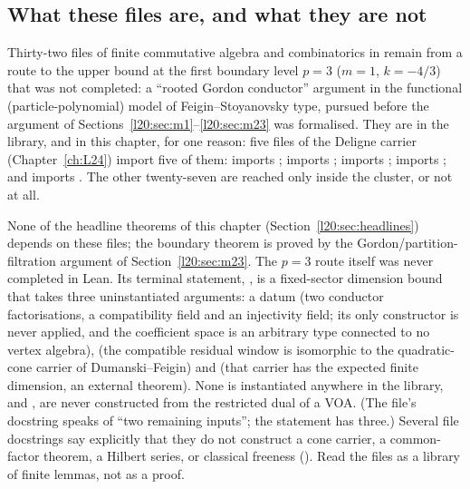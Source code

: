 \subsection{What these files are, and what they are not}

Thirty-two files of finite commutative algebra and combinatorics in  remain from a route to the upper
bound at the first boundary level $p=3$ ($m=1$, $k=-4/3$) that was not completed: a ``rooted Gordon conductor'' argument in the
functional (particle-polynomial) model of Feigin--Stoyanovsky type, pursued before the argument of
Sections~\ref{l20:sec:m1}--\ref{l20:sec:m23} was formalised. They are in the library, and in this chapter, for one reason: five files of the Deligne
carrier (Chapter~\ref{ch:L24}) import five of them:  imports
;  imports ;
 imports ;  imports
; and  imports . The
other twenty-seven are reached only inside the cluster, or not at all.

\begin{warning}[title={The $p=3$ route is incomplete and superseded; nothing in this chapter's headlines uses it}]
None of the headline theorems of this chapter (Section~\ref{l20:sec:headlines}) depends on these files; the boundary theorem is proved
by the Gordon/partition-filtration argument of Section~\ref{l20:sec:m23}. The $p=3$ route itself was never completed in Lean. Its terminal
statement, , is a fixed-sector dimension bound that takes three
uninstantiated arguments: a datum  (two conductor factorisations, a compatibility field and
an injectivity field; its only constructor  is never applied, and the coefficient space  is an arbitrary
type connected to no vertex algebra),  (the compatible residual window is isomorphic to the
quadratic-cone carrier of Dumanski--Feigin) and  (that carrier has the expected
finite dimension, an external theorem). None is instantiated anywhere in the library, and ,  are never constructed
from the restricted dual of a VOA. (The file's docstring speaks of ``two remaining inputs''; the statement has three.) Several file docstrings say explicitly that
they do not construct a cone carrier, a common-factor theorem, a Hilbert series, or classical freeness
(). Read the files as a library of finite lemmas, not as a proof.
\end{warning}

